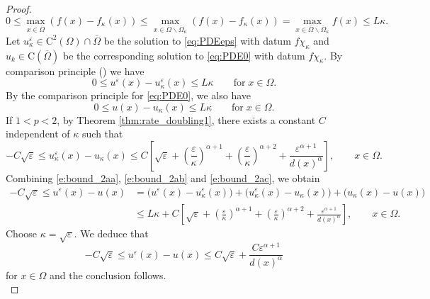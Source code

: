 \documentclass[11pt,reqno]{amsart}
\numberwithin{figure}{section}
\theoremstyle{plain}
\theoremstyle{remark}
\numberwithin{equation}{section}
\newcommand{\rmC}{\mathrm{C}}
\begin{document}
\begin{proof}
\begin{equation*}
    0\leq \max_{x\in \overline{\Omega}} (f(x) - f_\kappa(x)) \leq \max_{x\in \overline{\Omega}\backslash \overline{\Omega}_\kappa} (f(x) - f_\kappa(x)) = \max_{x\in \overline{\Omega}\backslash \overline{\Omega}_\kappa} f(x) \leq L\kappa.
\end{equation*}
Let $u^\varepsilon_\kappa\in \rmC^2(\Omega)\cap\overline{\Omega}$ be the solution to \eqref{eq:PDEeps} with datum $f\chi_{\kappa}$ and $u_k\in \mathrm{C}(\overline{\Omega})$ be the corresponding solution to \eqref{eq:PDE0} with datum $f{\chi_\kappa}$. By comparison principle (\cite[Corollary II.1]{Lasry1989}) we have
\begin{equation}\label{e:bound_2aa}
    0\leq u^\varepsilon(x) - u^\varepsilon_\kappa(x) \leq L\kappa \qquad\text{for}\;x\in \Omega.
\end{equation}
By the comparison principle for \eqref{eq:PDE0}, we also have
\begin{equation}\label{e:bound_2ab}
    0\leq u(x) - u_\kappa(x) \leq L\kappa \qquad\text{for}\;x\in \Omega.
\end{equation}
If $1<p<2$, by Theorem \ref{thm:rate_doubling1}, there exists a constant $C$ independent of $\kappa$ such that
\begin{equation}\label{e:bound_2ac}
    -C\sqrt{\varepsilon}\leq u^\varepsilon_\kappa(x) - u_\kappa(x)\leq C\left[\sqrt{\varepsilon} + \left(\frac{\varepsilon}{\kappa}\right)^{\alpha+1} + \left(\frac{\varepsilon}{\kappa}\right)^{\alpha+2} + \frac{\varepsilon^{\alpha+1}}{d(x)^\alpha}\right], \qquad x\in \Omega.
\end{equation}
Combining \eqref{e:bound_2aa}, \eqref{e:bound_2ab} and \eqref{e:bound_2ac}, we obtain
\begin{equation*}
\begin{split}
   -C\sqrt{\varepsilon}\leq u^\varepsilon(x) - u(x) &= \Big(u^\varepsilon(x) - u^\varepsilon_\kappa(x)\Big) + \Big(u^\varepsilon_\kappa(x) - u_\kappa(x)\Big) + \Big(u_\kappa(x) - u(x)\Big) \\
    &\leq L\kappa + C\left[\sqrt{\varepsilon} + \left(\frac{\varepsilon}{\kappa}\right)^{\alpha+1} + \left(\frac{\varepsilon}{\kappa}\right)^{\alpha+2} + \frac{\varepsilon^{\alpha+1}}{d(x)^\alpha}\right], \qquad x\in \Omega.
\end{split}
\end{equation*}
Choose $\kappa = \sqrt{\varepsilon}$. We deduce that
\begin{equation*}
    -C\sqrt{\varepsilon}\leq u^\varepsilon(x) - u(x) \leq C\sqrt{\varepsilon} + \frac{C\varepsilon^{\alpha+1}}{d(x)^\alpha}
\end{equation*}
for $x\in \Omega$ and the conclusion follows. \\


\end{proof}
\end{document}
